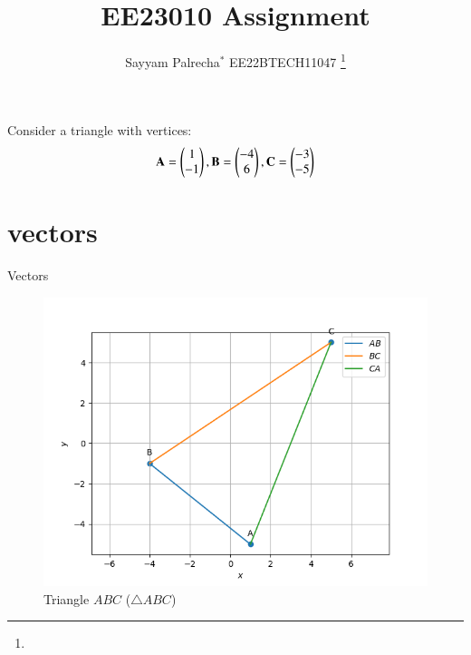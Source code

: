 \documentclass[journal,12pt,onecolumn]{IEEEtran}
\theoremstyle{remark}
\begin{document}


\vspace{3cm}
\title{
EE23010 Assignment
}
\author{ Sayyam Palrecha$^{*}$ EE22BTECH11047%
	\thanks{}	
}

\maketitle
\bigskip
\renewcommand{\thefigure}{\theenumi}
\renewcommand{\thetable}{\theenumi}

Consider a triangle with vertices:
\begin{align}
\mathbf{A} = \begin{pmatrix}1\\-1\end{pmatrix},
\mathbf{B} = \begin{pmatrix}-4\\6\end{pmatrix},
\mathbf{C} = \begin{pmatrix}-3\\-5\end{pmatrix}
\end{align}
\begin{table}[!ht]
	\section{vectors}
	\centering
	
	\caption{Vectors}
	\label{table:vectors}
\end{table}

\begin{figure}
\includegraphics[width=\columnwidth]{./figs/Q1.1.3.png}
\caption{Triangle $ABC$ ($\triangle ABC$)}
\label{fig:vectors}
\end{figure}
\end{document}
